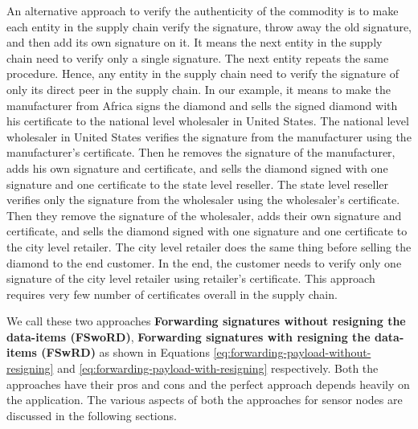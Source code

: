 	An alternative approach to verify the authenticity of the commodity is to make each entity in the supply chain verify the signature, throw away the old signature, and then add its own signature on it. 
	It means the next entity in the supply chain need to verify only a single signature.
	The next entity repeats the same procedure.
	Hence, any entity in the supply chain need to verify the signature of only its direct peer in the supply chain. 
	In our example, it means to make the manufacturer from Africa signs the diamond and sells the signed diamond with his certificate to the national level wholesaler in United States.
	The national level wholesaler in United States verifies the signature from the manufacturer using the manufacturer's certificate.
	Then he removes the signature of the manufacturer, adds his own signature and certificate, and sells the diamond signed with one signature and one certificate to the state level reseller.
	The state level reseller verifies only the signature from the wholesaler using the wholesaler's certificate.
	Then they remove the signature of the wholesaler, adds their own signature and certificate, and sells the diamond signed with one signature and one certificate to the city level retailer.
	The city level retailer does the same thing before selling the diamond to the end customer.
	In the end, the customer needs to verify only one signature of the city level retailer using retailer's certificate.
	This approach requires very few number of certificates overall in the supply chain.

	We call these two approaches \textbf{Forwarding signatures without resigning the data-items (FSwoRD)}, \textbf{Forwarding signatures with resigning the data-items (FSwRD)} as shown in Equations \ref{eq:forwarding-payload-without-resigning} and \ref{eq:forwarding-payload-with-resigning} respectively.
	Both the approaches have their pros and cons and the perfect approach depends heavily on the application.
	The various aspects of both the approaches for sensor nodes are discussed in the following sections.
